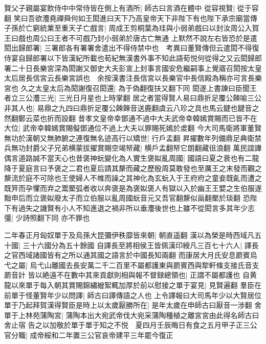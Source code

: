 賢父子親屬宴飲侍中中常侍皆在側上有酒所|{
	師古曰言酒在體中}
從容視賢|{
	從于容翻}
笑曰吾欲灋堯禪舜何如王閎進曰天下乃高皇帝天下非陛下有也陛下承宗廟當傳子孫於亡窮統業至重天子亡戲言|{
	周成王剪桐葉為珪與小弱弟戲曰以封汝周公入賀王曰戲也周公曰王者不可戲乃封小弱弟於唐古亡無通}
上默然不說左右皆恐於是遣閎出歸郎署|{
	三署郎各有署署舍遣出不得侍禁中也　考異曰董賢傳但云遣閎不得復侍宴自歸郎署以下皆漢紀所載也荀紀無漢書外事不知此語荀悦何從得之又云閎歸郎署二十日長樂宮深為閎謝又御史大夫彭宣上封事言國安危繼嗣事上覺寤召閎按太皇太后居長信宮云長樂宮誤也　余按漢書注長信宮以長樂官中長信殿為稱亦可言長樂宮也}
久之太皇太后為閎謝復召閎還|{
	為于偽翻復扶又翻下同}
閎遂上書諫曰臣聞王者立三公灋三光|{
	三光日月星也上時掌翻}
居之者當得賢人易曰鼎折足覆公餗喻三公非其人也|{
	易鼎之九四曰鼎折足覆公餗餗音送鹿翻虞云八珍之具也馬云䭈也䭈音之然翻鄭云菜也折而設翻}
昔孝文皇帝幸鄧通不過中大夫武帝幸韓嫣賞賜而已皆不在大位|{
	武帝幸韓嫣賞賜儗鄧通位不過上大夫以罪賜死嫣於䖍翻}
今大司馬衛將軍董賢無功於漢朝又無肺腑之連復無名迹高行以矯世|{
	行戶孟翻}
昇擢數年列備鼎足典衛禁兵無功封爵父子兄弟横蒙拔擢賞賜空竭帑藏|{
	横戶孟翻帑它朗翻藏徂浪翻}
萬民誼譁偶言道路誠不當天心也昔褒神蚖變化為人實生褒姒亂周國|{
	國語曰夏之衰也有二龍降于夏庭言曰予褒之二君也夏后請其漦而藏之歷殷周莫敢發也至厲王之末發而觀之漦流於庭不可除也王使婦人不帷而譟之其神化為玄蚖入于王府府之童妾既齓而遭之既笄而孕懼而弃之鬻檿弧者收以奔褒是為褒姒褒人有獄以入於幽王王嬖之生伯服遂黜申后而立褒姒廢太子而立伯服以亂周國蚖音元又吾官翻漦似甾翻檿於琰翻}
恐陛下有過失之譏賢有小人不知進退之禍非所以垂灋後世也上雖不從閎言多其年少志彊|{
	少詩照翻下同}
亦不罪也

二年春正月匈奴單于及烏孫大昆彌伊秩靡皆來朝|{
	朝直遥翻}
漢以為榮是時西域凡五十國|{
	三十六國分為五十餘國}
自譯長至將相侯王皆佩漢印綬凡三百七十六人|{
	譯長之官西域諸國皆有之所以通其國之語言於中國長知兩翻}
而康居大月氏安息罽賓烏弋之屬|{
	烏弋山離國去長安萬二千二百里不屬都護東與罽賓西與犂軒條支接氏音支罽音計}
皆以絶遠不在數中其來貢獻則相與報不督録總領也|{
	正謂不屬都護也}
自黄龍以來單于每入朝其賞賜錦繡繒絮輒加厚於前以慰接之單于宴見|{
	見賢遍翻}
羣臣在前單于怪董賢年少以問譯|{
	師古曰譯傳語之人也}
上令譯報曰大司馬年少以大賢居位單于乃起拜賀漢得賢臣是時上以太歲厭勝所在|{
	是年太歲在申師古曰厭音一涉翻}
舍單于上林苑蒲陶宮|{
	蒲陶本出大宛武帝伐大宛采蒲陶種植之離宮宮由此得名師古曰舍止宿}
告之以加敬於單于單于知之不悦　夏四月壬辰晦日有食之五月甲子正三公官分職|{
	成帝綏和二年置三公官哀帝建平三年罷今復正}


